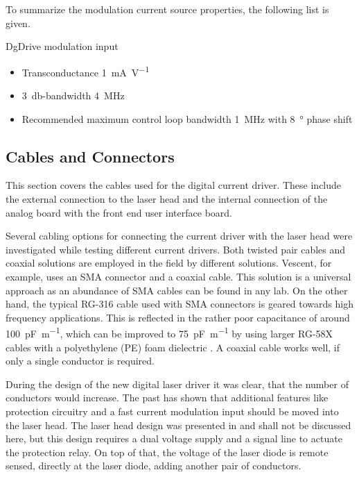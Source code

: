 To summarize the modulation current source properties, the following list is given.
\begin{center}
    \begin{deviceProperties}[label={lst:dgDrive_properties_modulation}]{DgDrive modulation input}
    \begin{itemize}
        \item Transconductance \qty{1}{\mA \per \V}
        \item \qty{3}{\decibel}-bandwidth \qty{4}{\MHz}
        \item Recommended maximum control loop bandwidth \qty{1}{\MHz} with \qty{8}{\degree} phase shift
    \end{itemize}
    \end{deviceProperties}
\end{center}

\subsection{Cables and Connectors}
\label{sec:cables_and_connectors}
This section covers the cables used for the digital current driver. These include the external connection to the laser head and the internal connection of the analog board with the front end user interface board.

Several cabling options for connecting the current driver with the laser head were investigated while testing different current drivers. Both twisted pair cables and coaxial solutions are employed in the field by different solutions. Vescent, for example, uses an SMA connector and a coaxial cable. This solution is a universal approach as an abundance of SMA cables can be found in any lab. On the other hand, the typical RG-316 cable used with SMA connectors is geared towards high frequency applications. This is reflected in the rather poor capacitance of around \qty{100}{\pF \per \m}, which can be improved to \qty{75}{\pF \per \m} by using larger RG-58X cables with a polyethylene (PE) foam dielectric \cite{datasheet_7808A}. A coaxial cable works well, if only a single conductor is required.

During the design of the new digital laser driver it was clear, that the number of conductors would increase. The past has shown that additional features like protection circuitry and a fast current modulation input should be moved into the laser head. The laser head design was presented in \cite{current_mod_paper} and shall not be discussed here, but this design requires a dual voltage supply and a signal line to actuate the protection relay. On top of that, the voltage of the laser diode is remote sensed, directly at the laser diode, adding another pair of conductors.

